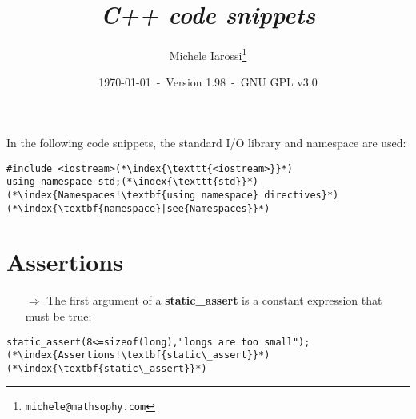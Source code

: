 \documentclass[10pt]{article}
\begin{document}
\title{\emph{C++ code snippets}}
\author{Michele Iarossi\thanks{\texttt{michele@mathsophy.com}}}
\date{\small \today~-~Version 1.98~-~GNU GPL v3.0}


\maketitle

\small

\begin{frame}{}
\setlength\columnsep{1cm}
\begin{multicols}{2}
\tableofcontents
\end{multicols}
\end{frame}
\newpage
\noindent
In the following code snippets, the standard I/O library and namespace are used:
\begin{lstlisting}
#include <iostream>(*\index{\texttt{<iostream>}}*)
using namespace std;(*\index{\texttt{std}}*)(*\index{Namespaces!\textbf{using namespace} directives}*)(*\index{\textbf{namespace}|see{Namespaces}}*)
\end{lstlisting}
%
%
\section{Assertions}
\small
\begin{enumerate}
\item[$\Rightarrow$] The first argument of a \textbf{static\_assert} is a constant expression that must be true:
\end{enumerate}
\begin{lstlisting}
static_assert(8<=sizeof(long),"longs are too small");(*\index{Assertions!\textbf{static\_assert}}*)(*\index{\textbf{static\_assert}}*)
\end{lstlisting}
%
%
\end{document}
